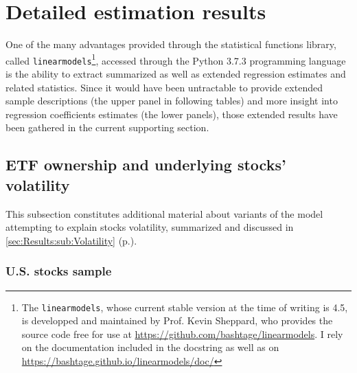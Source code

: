 \section{Detailed estimation results}
\label{app:sec:DetailedResults}
One of the many advantages provided through the statistical functions library, called \texttt{linearmodels}\footnote{The \texttt{linearmodels}, whose current stable version at the time of writing is 4.5, is developped and maintained by Prof. Kevin Sheppard, who provides the source code free for use at \url{https://github.com/bashtage/linearmodels}. I rely on the documentation included in the docstring as well as on \url{https://bashtage.github.io/linearmodels/doc/}}, accessed through the Python 3.7.3 programming language is the ability to extract summarized as well as extended regression estimates and related statistics. Since it would have been untractable to provide extended sample descriptions (the upper panel in following tables) and more insight into regression coefficients estimates (the lower panels), those extended results have been gathered in the current supporting section.
\subsection{ETF ownership and underlying stocks' volatility}
\label{app:sec:DetailedResults:Volatility}
This subsection constitutes additional material about variants of the model attempting to explain stocks volatility, summarized and discussed in \autoref{sec:Results:sub:Volatility} (p.\pageref{sec:Results:sub:Volatility}).
\subsubsection{U.S. stocks sample}
\begin{landscape}
  {\linespread{1.0}
    \begin{table}
      
    \end{table}
    \begin{table}
      
    \end{table}
    \begin{table}
      
    \end{table}
    \begin{table}
      
    \end{table}
  }
\end{landscape}

